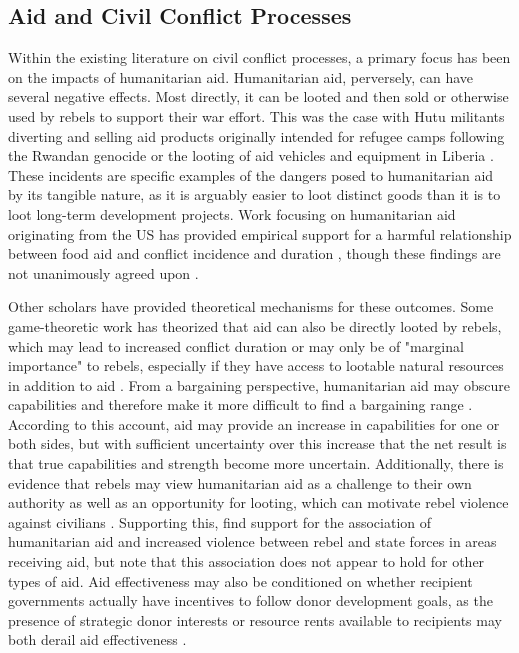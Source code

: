 \documentclass[12pt, letterpaper]{article}
\renewcommand{\cite}{\citep}
\begin{document}
\subsection{Aid and Civil Conflict Processes}

Within the existing literature on civil conflict processes, a primary focus has been on the impacts of humanitarian aid. Humanitarian aid, perversely, can have several negative effects. Most directly, it can be looted and then sold or otherwise used by rebels to support their war effort. This was the case with Hutu militants diverting and selling aid products originally intended for refugee camps following the Rwandan genocide \cite{cooley2002ngo,polman2010crisis} or the looting of aid vehicles and equipment in Liberia \cite[p.~366]{bryer1997better}. These incidents are specific examples of the dangers posed to humanitarian aid by its tangible nature, as it is arguably easier to loot distinct goods than it is to loot long-term development projects. Work focusing on humanitarian aid originating from the US has provided empirical support for a harmful relationship between food aid and conflict incidence and duration \cite{nunn2014us, chu2017robust}, though these findings are not unanimously agreed upon \cite{mary2020humanitarian, lehmann2021us, de2009}.

Other scholars have provided theoretical mechanisms for these outcomes. Some game-theoretic work has theorized that aid can also be directly looted by rebels, which may lead to increased conflict duration or may only be of "marginal importance" to rebels, especially if they have access to lootable natural resources in addition to aid \cite[p.~383]{addison2002}. From a bargaining perspective, humanitarian aid may obscure capabilities and therefore make it more difficult to find a bargaining range \cite{narang2015assisting}. According to this account, aid may provide an increase in capabilities for one or both sides, but with sufficient uncertainty over this increase that the net result is that true capabilities and strength become more uncertain. Additionally, there is evidence that rebels may view humanitarian aid as a challenge to their own authority as well as an opportunity for looting, which can motivate rebel violence against civilians \cite{wood2015doing}. Supporting this, \citet{wood2016aiding} find support for the association of humanitarian aid and increased violence between rebel and state forces in areas receiving aid, but note that this association does not appear to hold for other types of aid. Aid effectiveness may also be conditioned on whether recipient governments actually have incentives to follow donor development goals, as the presence of strategic donor interests or resource rents available to recipients may both derail aid effectiveness \cite{girod2012effective}. 
\end{document}
